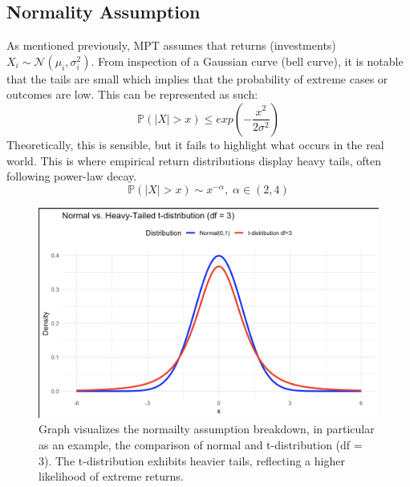\documentclass[11pt]{article}
\newcommand{\N}{\mathcal{N}}
\renewcommand{\P}{\mathbb{P}}
\begin{document}
    \subsection{Normality Assumption}
    As mentioned previously, MPT assumes that returns (investments) $X_i \sim \N(\mu_i,\sigma^2_i)$. From inspection of a Gaussian curve (bell curve), it is notable that the tails are small which implies that the probability of extreme cases or outcomes are low. This can be represented as such:
    \begin{equation}
        \P(|X| > x)\le exp\left(-\frac{x^2}{2\sigma^2}\right)
    \end{equation}
    Theoretically, this is sensible, but it fails to highlight what occurs in the real world. This is where empirical return distributions display heavy tails, often following power-law decay.
    \begin{equation}
        \P(|X|>x)\sim x^{-\alpha},\;\alpha\in(2, 4)
    \end{equation}

    \begin{figure}[H]
        \centering
        \begin{minipage}{0.35\textwidth}
            \caption{Graph visualizes the normailty assumption breakdown, in particular as an example, the comparison of normal and t-distribution (df = 3). The t-distribution exhibits heavier tails, reflecting a higher likelihood of extreme returns.}
            \label{fig:gauss_vs_heavy}
        \end{minipage}
        \hfill
        \begin{minipage}{0.6\textwidth}
            \includegraphics[width=\linewidth]{Graphs_Chris/gaussvsheavy.png}
        \end{minipage}
    \end{figure}
\end{document}
